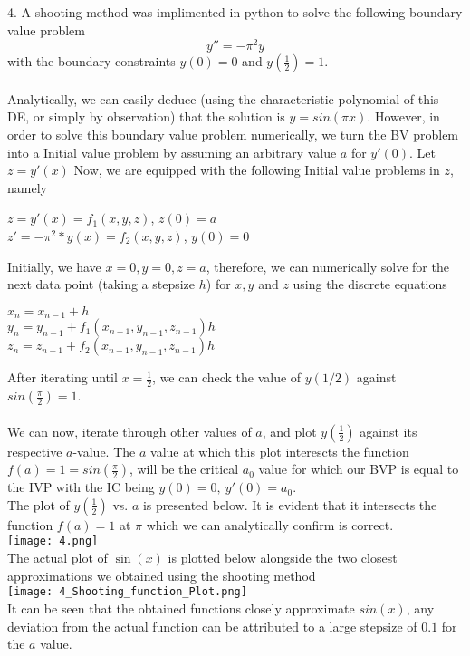 \documentclass[12pt]{article}
\begin{document}
	 4. A shooting method was implimented in python to solve the following boundary value problem
	$$y'' = -\pi^2 y$$ with the boundary constraints $y(0) = 0$ and $y(\frac{1}{2}) = 1$.
\\\\
Analytically, we can easily deduce (using the characteristic polynomial of this DE, or simply by observation) that the solution is $y=sin(\pi x)$. 
However, in order to solve this boundary value problem numerically, we turn the BV problem into a Initial value problem by assuming an arbitrary value $a$ for $y'(0)$. Let $z = y'(x)$
Now, we are equipped with the following Initial value problems in $z$, namely 
\begin{center}
	$z = y'(x) = f_1(x,y,z)$, \quad \quad $z(0) = a$ \\
	$z' = -\pi^2*y(x) = f_2(x,y,z)$, \quad \quad $y(0) = 0$ 
\end{center}		

Initially, we have $x=0, y=0, z=a$, therefore, we can numerically solve for the next data point (taking a stepsize $h$) for $x,y$ and $z$ using the discrete equations 
\begin{center}
	$x_{n} = x_{n-1} + h$\\
	$y_{n} = y_{n-1} + f_1(x_{n-1}, y_{n-1}, z_{n-1})h$\\
	$z_{n} = z_{n-1} + f_2(x_{n-1}, y_{n-1}, z_{n-1})h$
\end{center}

After iterating until $x=\frac{1}{2}$, we can check the value of $y(1/2)$ against $sin(\frac{\pi}{2}) = 1$. \\\\ 
We can now, iterate through other values of $a$, and plot $y(\frac{1}{2})$ against its respective $a$-value. The $a$ value at which this plot interescts the function $f(a) = 1 = sin(\frac{\pi}{2})$, will be the critical $a_0$ value for which our BVP is equal to the IVP with the IC being $y(0)=0, \ y'(0) = a_0$.   \\ \newpage
The plot of $y(\frac{1}{2})$ vs. $a$ is presented below. It is evident that it intersects the function $f(a) = 1$ at $\pi$ which we can analytically confirm is correct.\\
\texttt{[image: 4.png]}\\
The actual plot of $\sin(x)$ is plotted below alongside the two closest approximations we obtained using the shooting method\\
\texttt{[image: 4\_Shooting\_function\_Plot.png]}\\
It can be seen that the obtained functions closely approximate $sin(x)$, any deviation from the actual function can be attributed to a large stepsize of $0.1$ for the $a$ value.
	
\end{document}

